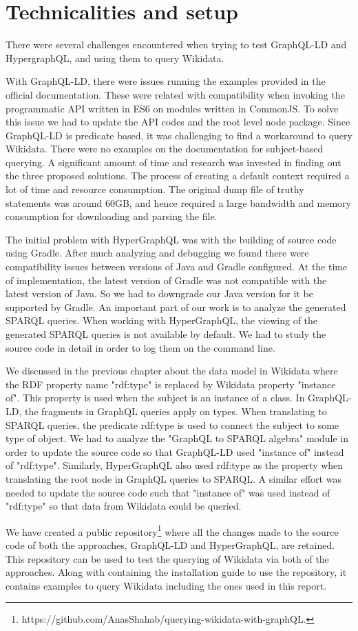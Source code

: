 \chapter{Technicalities and setup}
There were several challenges encountered when trying to test GraphQL-LD and HypergraphQL, and using them to query Wikidata. 

With GraphQL-LD, there were issues running the examples provided in the official documentation. These were related with compatibility when invoking the programmatic API written in ES6 on modules written in CommonJS. To solve this issue we had to update the API codes and the root level node package. Since GraphQL-LD is predicate based, it was challenging to find a workaround to query Wikidata. There were no examples on the documentation for subject-based querying. A significant amount of time and research was invested in finding out the three proposed solutions. The process of creating a default context required a lot of time and resource consumption. The original dump file of truthy statements was around 60GB, and hence required a large bandwidth and memory consumption for downloading and parsing the file. 

The initial problem with HyperGraphQL was with the building of source code using Gradle. After much analyzing and debugging we found there were compatibility issues between versions of Java and Gradle configured. At the time of implementation, the latest version of Gradle was not compatible with the latest version of Java. So we had to downgrade our Java version for it be supported by Gradle. An important part of our work is to analyze the generated SPARQL queries. When working with HyperGraphQL, the viewing of the generated SPARQL queries is not available by default. We had to study the source code in detail in order to log them on the command line. 

We discussed in the previous chapter about the data model in Wikidata where the RDF property name "rdf:type" is replaced by Wikidata property "instance of". This property is used when the subject is an instance of a class. In GraphQL-LD, the fragments in GraphQL queries apply on types. When translating to SPARQL queries, the predicate rdf:type is used to connect the subject to some type of object. We had to analyze the "GraphQL to SPARQL algebra" module in order to update the source code so that GraphQL-LD used "instance of" instead of "rdf:type". Similarly, HyperGraphQL also used rdf:type as the property when translating the root node in GraphQL queries to SPARQL. A similar effort was needed to update the source code such that "instance of" was used instead of "rdf:type" so that data from Wikidata could be queried.

We have created a public repository\footnote{https://github.com/AnasShahab/querying-wikidata-with-graphQL.} where all the changes made to the source code of both the approaches, GraphQL-LD and HyperGraphQL, are retained. This repository can be used to test the querying of Wikidata via both of the approaches. Along with containing the installation guide to use the repository, it contains examples to query Wikidata including the ones used in this report.
